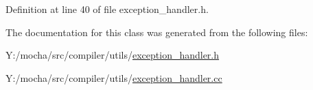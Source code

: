 Definition at line 40 of file exception\_\-handler.h.



The documentation for this class was generated from the following files:\begin{DoxyCompactItemize}
\item 
Y:/mocha/src/compiler/utils/\hyperlink{exception__handler_8h}{exception\_\-handler.h}\item 
Y:/mocha/src/compiler/utils/\hyperlink{exception__handler_8cc}{exception\_\-handler.cc}\end{DoxyCompactItemize}
